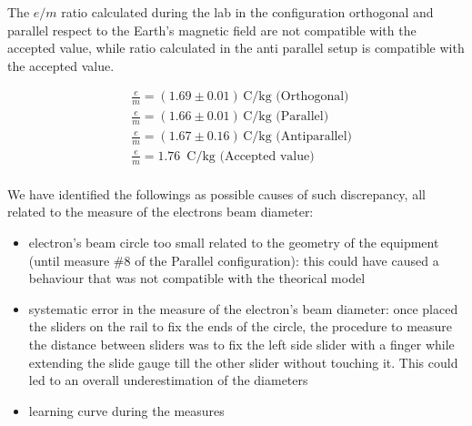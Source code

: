 The $e/m$ ratio calculated during the lab in the configuration orthogonal and parallel respect to the Earth's magnetic field are not compatible with the accepted value, while ratio calculated in the anti parallel setup is compatible with the accepted value.

\begin{align*}
    &\frac{e}{m}=(1.69\pm0.01)\, \mathrm{C/kg}\,\, \text{(Orthogonal)}\\
    &\frac{e}{m}=(1.66\pm0.01)\, \mathrm{C/kg}\,\, \text{(Parallel)}\\
    &\frac{e}{m}=(1.67\pm0.16)\, \mathrm{C/kg}\,\, \text{(Antiparallel)}\\
    &\frac{e}{m}=1.76\,\,\, \mathrm{C/kg}\,\, \text{(Accepted value)}\\
\end{align*}

We have identified the followings as possible causes of such discrepancy, all related to the measure of the electrons beam diameter:
\begin{itemize}
    \item electron's beam circle too small related to the geometry of the equipment (until measure \#8 of the Parallel configuration): this could have caused a behaviour that was not compatible with the theorical model
    \item systematic error in the measure of the electron's beam diameter: once placed the sliders on the rail to fix the ends of the circle, the procedure to measure the distance between sliders was to fix the left side slider with a finger while extending the slide gauge till the other slider without touching it. This could led to an overall underestimation of the diameters
    \item learning curve during the measures
\end{itemize}

